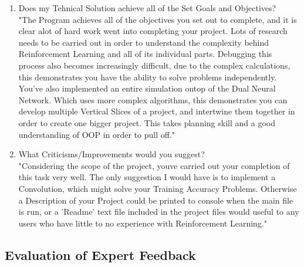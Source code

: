 \begin{flushleft}
\begin{enumerate}
            \item Does my Tehnical Solution achieve all of the Set Goals and Objectives? \\
                \vspace{0.2cm}
                "The Program achieves all of the objectives you set out to complete, and it is clear alot of hard work went into completing your
                project. Lots of research needs to be carried out in order to understand the complexity behind Reinforcement Learning and all
                of its individual parts. Debugging this process also becomes increasingly difficult, due to the complex calculations, this 
                demonstrates you have the ability to solve problems independently. \\
                \vspace{0.2cm}
                You've also implemented an entire simulation ontop of the Dual Neural Network. Which uses more complex algorithms, this demonstrates
                you can develop multiple Vertical Slices of a project, and intertwine them together in order to create one bigger project. This
                takes planning skill and a good understanding of OOP in order to pull off." \\

                \vspace{0.5cm}
            \item What Criticisms/Improvements would you suggest? \\
                \vspace{0.2cm}
                "Considering the scope of the project, youve carried out your completion of this task very well. The only suggestion I would have is
                to implement a Convolution, which might solve your Training Accuracy Problems. Otherwise a Description of your Project could be
                printed to console when the main file is run, or a 'Readme' text file included in the project files would useful to any users who 
                have little to no experience with Reinforcement Learning." \\

                \vspace{0.5cm}
        \end{enumerate}


        \vspace{0.5cm}
    \subsection{Evaluation of Expert Feedback}
        \vspace{0.2cm}
        


\end{flushleft}
